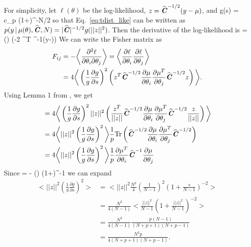 For simplicity, let $\ell(\theta)$ be the log-likelihood, $z = \widehat{\textbf{\textit{C}}}^{-1/2} (y - \mu)$, and 
\beq
g(s) = c_p \left(1+\right)^{-N/2}
\eeq
so that Eq.~\ref{eq:tdist_like} can be written as $p(y \,|\, \mu(\theta),\widehat{\textbf{\textit{C}}},N) = |\widehat{\textbf{\textit{C}}}|^{-1/2} g(||z||^2)$.
Then the derivative of the log-likelihood is  
\beq
{} = \left(\right) \left(-2 ^T \estC^{-1}(y-\mu)\right) 
\eeq
We can write the Fisher matrix as  
\begin{align}
F_{ij} &= - \bigg<\frac{\partial^2 \ell}{\partial \theta_i \partial \theta_j}\bigg>
    = \bigg<\frac{\partial \ell}{\partial \theta_i} \frac{\partial \ell}{\partial \theta_j}\bigg> \\ 
&= 4\bigg< \left(\frac{1}{g}\frac{\partial g}{\partial s}\right)^2
\left(z^T\widehat{\textbf{\textit{C}}}^{-1/2}\frac{\partial \mu}{\partial \theta_i} \frac{\partial \mu^T}{\partial \theta_j}\widehat{\textbf{\textit{C}}}^{-1/2} z \right)\bigg>.
\end{align}
Using Lemma 1 from \cite{lange1989}, we get  
\begin{align} \label{eq:app1}
&= 4\bigg< \left(\frac{1}{g}\frac{\partial g}{\partial s}\right)^2
||z||^2 \left(\frac{z^T}{||z||}\estC^{-1/2}\frac{\partial \mu}{\partial \theta_i} \frac{\partial \mu^T}{\partial \theta_j}\estC^{-1/2}\frac{z}{||z||} \right)\bigg> \\
&= 4\bigg<||z||^2 \left(\frac{1}{g}\frac{\partial g}{\partial s}\right)^2 \bigg>
\frac{1}{p} {\rm Tr}\left(\estC^{-1/2}\frac{\partial \mu}{\partial \theta_i} \frac{\partial \mu^T}{\partial \theta_j}\estC^{-1/2}\right) \\
&= 4\bigg<||z||^2 \left(\frac{1}{g}\frac{\partial g}{\partial s}\right)^2 \bigg> \frac{1}{p}\frac{\partial \mu^T}{\partial \theta_i}\estC^{-1}\frac{\partial \mu}{\partial \theta_j}
\end{align}
Since
\beq
{} = - \left(\right) \left(1+\right)^{-1} 
\eeq
we can expand
\begin{align}
\bigg<||z||^2 \left(\frac{1}{g}\frac{\partial g}{\partial s}\right)^2 \bigg> &= \bigg<||z||^2 \frac{N^2}{4} \left(\frac{1}{N-1}\right)^2 \left(1+\frac{s}{N-1}\right)^{-2} \bigg> \\
&= \frac{N^2}{4(N-1)}\bigg<\frac{||z||^2}{N-1} \left(1+\frac{||z||^2}{N-1}\right)^{-2} \bigg>\\
&= \frac{N^2}{4(N-1)}\frac{p (N-1)}{(N+p+1)(N+p-1)}\\
&= \frac{N^2 p}{4(N+p+1)(N+p-1)}.
\end{align}
